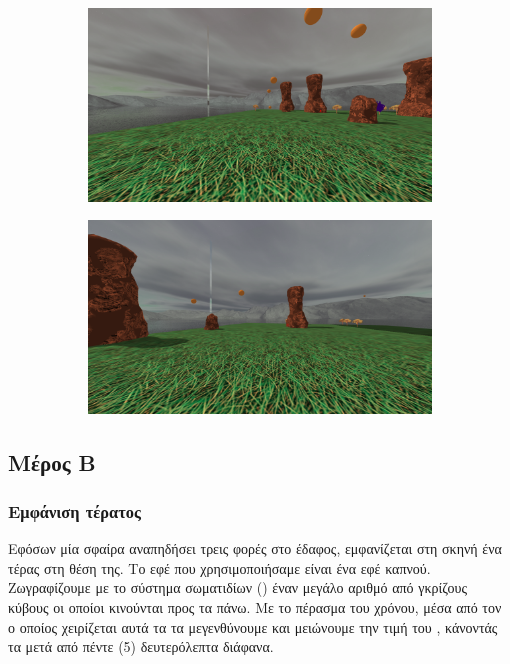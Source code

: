 \documentclass[11pt]{scrartcl} %
\newenvironment{centerimg}[1]%
{%
    \begin{figure}[H]
        #1
    \begin{center}
}%
{%
    \end{center}
    \end{figure}
}
\begin{document}
\begin{centerimg}{\caption{Η σκηνή με μπάλες να αναπηδάνε και με τις δύο εξισώσεις κρούσης.}}
    \begin{subfigure}[b]{0.5\textwidth}
        \includegraphics[width=\textwidth]{./assets/balls_1.png}
    \end{subfigure}
    \begin{subfigure}[b]{0.5\textwidth}
        \includegraphics[width=\textwidth]{./assets/balls_2.png}
    \end{subfigure}
\end{centerimg}

\subsection{Μέρος Β}

\subsubsection{Εμφάνιση τέρατος}

Εφόσων μία σφαίρα αναπηδήσει τρεις φορές στο έδαφος, εμφανίζεται στη σκηνή ένα τέρας στη θέση της. Το εφέ που 
χρησιμοποιήσαμε είναι ένα εφέ καπνού. Ζωγραφίζουμε με το σύστημα σωματιδίων () 
έναν μεγάλο αριθμό από γκρίζους κύβους οι οποίοι κινούνται προς τα πάνω. 
Με το πέρασμα του χρόνου, μέσα από τον  ο οποίος χειρίζεται αυτά τα  τα μεγενθύνουμε
και μειώνουμε την τιμή του , κάνοντάς τα μετά από πέντε (5) δευτερόλεπτα διάφανα. 
\end{document}
